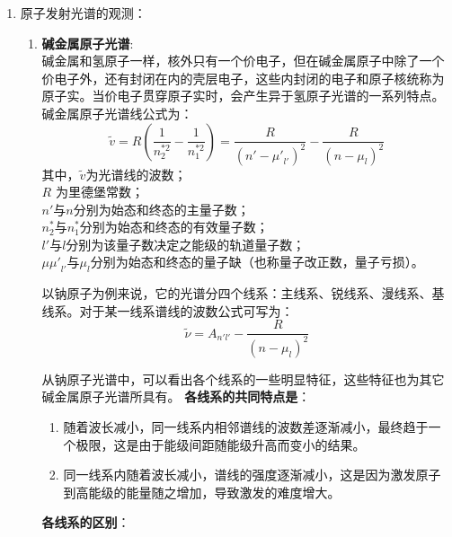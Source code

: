 \documentclass[dvipsnames, svgnames,a4paper,11pt]{article}
\begin{document}
			\begin{enumerate}
			\item 原子发射光谱的观测：
				\begin{enumerate}
					\item \textbf{碱金属原子光谱}:\\
						碱金属和氢原子一样，核外只有一个价电子，但在碱金属原子中除了一个价电子外，还有封闭在内的壳层电子，这些内封闭的电子和原子核统称为原子实。当价电子贯穿原子实时，会产生异于氢原子光谱的一系列特点。碱金属原子光谱线公式为：
						\[
						\widetilde{v}=R(\frac{1}{n_2^{*2}}-\frac{1}{n_1^{*2}})=\frac{R}{{(n'-{\mu'}_{l'})}^2}-\frac{R}{{(n-\mu_l)}^2}
						\]
						其中，$\widetilde{v}$为光谱线的波数；\\ $R$ 为里德堡常数；\\$n'$与$n$分别为始态和终态的主量子数；\\$n_2^{*}$与$n_1^{*}$分别为始态和终态的有效量子数；\\$l′$与$l$分别为该量子数决定之能级的轨道量子数；\\$𝜇{\mu'}_{l'}$与$\mu_l$分别为始态和终态的量子缺（也称量子改正数，量子亏损）。
						
						以钠原子为例来说，它的光谱分四个线系：主线系、锐线系、漫线系、基线系。对于某一线系谱线的波数公式可写为：
						\[\tilde{\nu} = A_{n'l'}-\dfrac{R}{(n-\mu_{l})^2}\]
						
						从钠原子光谱中，可以看出各个线系的一些明显特征，这些特征也为其它碱金属原子光谱所具有。
						\textbf{各线系的共同特点是}：
							\begin{enumerate}
								\item 随着波长减小，同一线系内相邻谱线的波数差逐渐减小，最终趋于一个极限，这是由于能级间距随能级升高而变小的结果。
								\item 同一线系内随着波长减小，谱线的强度逐渐减小，这是因为激发原子到高能级的能量随之增加，导致激发的难度增大。
							\end{enumerate}
						\textbf{各线系的区别}：
						


\end{enumerate}
\end{enumerate}
\end{document}
